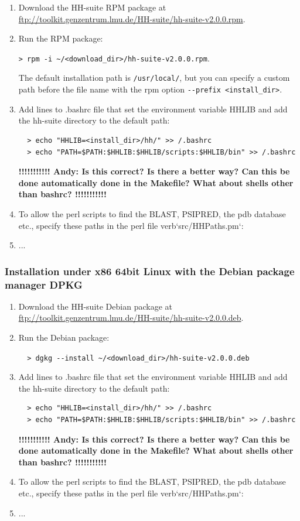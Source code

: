 \documentclass[11pt,a4paper]{article}
\begin{document}
\begin{enumerate}
\item Download the HH-suite RPM package at \url{ftp://toolkit.genzentrum.lmu.de/HH-suite/hh-suite-v2.0.0.rpm}.
\item Run the RPM package:

  \verb`> rpm -i ~/<download_dir>/hh-suite-v2.0.0.rpm`.
  
  The default installation path is \verb`/usr/local/`, but you can specify a custom path before the file name with the rpm option \verb`--prefix <install_dir>`.
\item Add lines to .bashrc file that set the environment variable HHLIB and add the hh-suite directory to the default path:
\begin{verbatim}
  > echo "HHLIB=<install_dir>/hh/" >> /.bashrc
  > echo "PATH=$PATH:$HHLIB:$HHLIB/scripts:$HHLIB/bin" >> /.bashrc
\end{verbatim}
  {\bf !!!!!!!!!!! Andy: Is this correct? Is there a better way? Can this be done automatically done in the Makefile? What about shells other than bashrc? !!!!!!!!!!!}

\item To allow the perl scripts to find the BLAST, PSIPRED, the pdb database etc., specify these paths in the perl file verb`src/HHPaths.pm`:

\item  ...
\end{enumerate}

\subsubsection*{Installation under x86 64bit Linux with the Debian package manager DPKG}

\begin{enumerate}
\item Download the HH-suite Debian package at \url{ftp://toolkit.genzentrum.lmu.de/HH-suite/hh-suite-v2.0.0.deb}.
\item Run the Debian package:

\verb`  > dgkg --install ~/<download_dir>/hh-suite-v2.0.0.deb`

\item Add lines to .bashrc file that set the environment variable HHLIB and add the hh-suite directory to the default path:
\begin{verbatim}
  > echo "HHLIB=<install_dir>/hh/" >> /.bashrc
  > echo "PATH=$PATH:$HHLIB:$HHLIB/scripts:$HHLIB/bin" >> /.bashrc
\end{verbatim}
{\bf !!!!!!!!!!! Andy: Is this correct? Is there a better way? Can this be done automatically done in the Makefile? What about shells other than bashrc? !!!!!!!!!!!}

\item To allow the perl scripts to find the BLAST, PSIPRED, the pdb database etc., specify these paths in the perl file verb`src/HHPaths.pm`:

\item ...\\
\end{enumerate}
\end{document}
